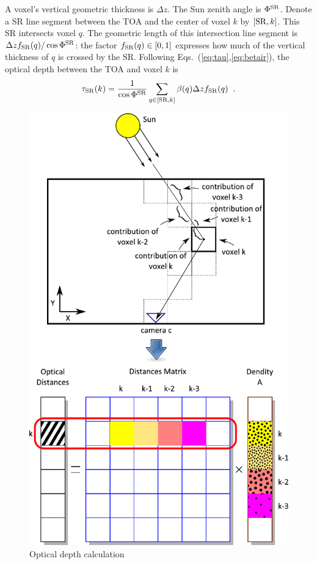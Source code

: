 \documentclass[10pt,twocolumn,letterpaper]{article}
\newcommand{\yoavcomment}[1]{}
\renewcommand{\yoavcomment}[1]{#1} %
\begin{document}
A voxel's vertical geometric thickness is $\Delta z$.  The Sun zenith angle is $\Phi^{\rm SR}$. Denote a SR line segment between the TOA and the center of voxel $k$ by $[{\rm SR},k]$.
This SR intersects voxel $q$. The geometric length of this intersection
line segment is $\Delta z f_{\rm SR}(q)/\cos\Phi^{\rm SR}$: the factor
\mbox{$f_{\rm SR}(q)\in [0,1]$} expresses how much of the vertical thickness of $q$ is crossed by the SR. Following Eqs.~(\ref{eq:tau},\ref{eq:betair}), the optical depth between the TOA and voxel $k$ is
\begin{equation}
  \tau_{\rm SR}(k)=\frac{1}{\cos\Phi^{\rm SR}}
     \sum_{q \in[{\rm SR},k]}
     \beta(q)\Delta z  f_{\rm SR}(q)
  \;\;.
  \label{eq:lSRn}
\end{equation}
\begin{figure}
  \centering
  \yoavcomment{\includegraphics[width=\columnwidth]{images/optical_distance.pdf}}
  \caption{Optical depth calculation}
  \label{fig:optidepth}
\end{figure}
\end{document}
